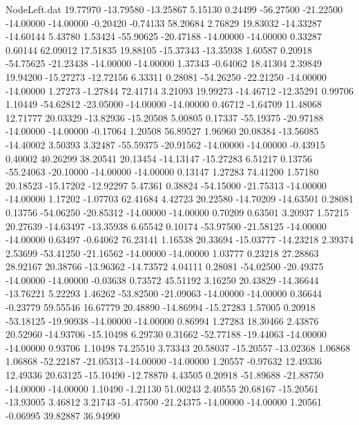 \begin{filecontents}{NodeLeft.dat}
  19.77970  -13.79580  -13.25867     5.15130    0.24499  -56.27500  -21.22500  -14.00000  -14.00000   -0.20420   -0.74133   58.20684    2.76829
  19.83032  -14.33287  -14.60144     5.43780    1.53424  -55.90625  -20.47188  -14.00000  -14.00000    0.33287    0.60144   62.09012   17.51835
  19.88105  -15.37343  -13.35938     1.60587    0.20918  -54.75625  -21.23438  -14.00000  -14.00000    1.37343   -0.64062   18.41304    2.39849
  19.94200  -15.27273  -12.72156     6.33311    0.28081  -54.26250  -22.21250  -14.00000  -14.00000    1.27273   -1.27844   72.41714    3.21093
  19.99273  -14.46712  -12.35291     0.99706    1.10449  -54.62812  -23.05000  -14.00000  -14.00000    0.46712   -1.64709   11.48068   12.71777
  20.03329  -13.82936  -15.20508     5.00805    0.17337  -55.19375  -20.97188  -14.00000  -14.00000   -0.17064    1.20508   56.89527    1.96960
  20.08384  -13.56085  -14.40002     3.50393    3.32487  -55.59375  -20.91562  -14.00000  -14.00000   -0.43915    0.40002   40.26299   38.20541
  20.13454  -14.13147  -15.27283     6.51217    0.13756  -55.24063  -20.10000  -14.00000  -14.00000    0.13147    1.27283   74.41200    1.57180
  20.18523  -15.17202  -12.92297     5.47361    0.38824  -54.15000  -21.75313  -14.00000  -14.00000    1.17202   -1.07703   62.41684    4.42723
  20.22580  -14.70209  -14.63501     0.28081    0.13756  -54.06250  -20.85312  -14.00000  -14.00000    0.70209    0.63501    3.20937    1.57215
  20.27639  -14.63497  -13.35938     6.65542    0.10174  -53.97500  -21.58125  -14.00000  -14.00000    0.63497   -0.64062   76.23141    1.16538
  20.33694  -15.03777  -14.23218     2.39374    2.53699  -53.41250  -21.16562  -14.00000  -14.00000    1.03777    0.23218   27.28863   28.92167
  20.38766  -13.96362  -14.73572     4.04111    0.28081  -54.02500  -20.49375  -14.00000  -14.00000   -0.03638    0.73572   45.51192    3.16250
  20.43829  -14.36644  -13.76221     5.22293    1.46262  -53.82500  -21.09063  -14.00000  -14.00000    0.36644   -0.23779   59.55546   16.67779
  20.48890  -14.86994  -15.27283     1.57005    0.20918  -53.18125  -19.90938  -14.00000  -14.00000    0.86994    1.27283   18.30466    2.43876
  20.52960  -14.93706  -15.10498     6.29730    0.31662  -52.77188  -19.44063  -14.00000  -14.00000    0.93706    1.10498   74.25510    3.73343
  20.58037  -15.20557  -13.02368     1.06868    1.06868  -52.22187  -21.05313  -14.00000  -14.00000    1.20557   -0.97632   12.49336   12.49336
  20.63125  -15.10490  -12.78870     4.43505    0.20918  -51.89688  -21.88750  -14.00000  -14.00000    1.10490   -1.21130   51.00243    2.40555
  20.68167  -15.20561  -13.93005     3.46812    3.21743  -51.47500  -21.24375  -14.00000  -14.00000    1.20561   -0.06995   39.82887   36.94990

\end{filecontents}
